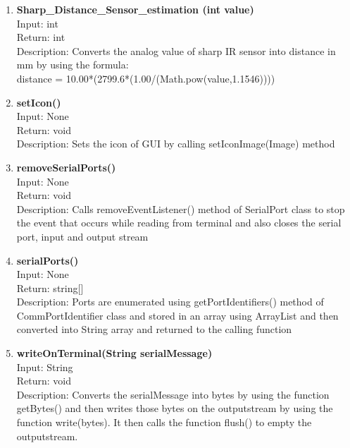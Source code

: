 \documentclass{article}
\begin{document}
\begin{enumerate}
		\item \textbf{Sharp\_Distance\_Sensor\_estimation (int value)} \vspace{0.25cm} \\
		Input: int\\
		Return: int\\
		Description: Converts the analog value of sharp IR sensor into distance in mm by using the formula:\\ distance =  10.00*(2799.6*(1.00/(Math.pow(value,1.1546)))) \vspace{0.5cm} \\
		\item \textbf{setIcon()} \vspace{0.25cm} \\
		Input: None\\
		Return: void\\
		Description: Sets the icon of GUI by calling setIconImage(Image) method \vspace{0.5cm} \\
		\item \textbf{removeSerialPorts()} \vspace{0.25cm} \\
		Input: None\\
		Return: void\\
		Description: Calls removeEventListener() method of SerialPort class to stop the event that occurs while reading from terminal and also closes the serial port, input and output stream \vspace{0.5cm} \\
		\item \textbf{serialPorts()} \vspace{0.25cm} \\
		Input: None\\
		Return: string[]\\
		Description: Ports are enumerated using getPortIdentifiers() method of CommPortIdentifier class and stored in an array using ArrayList and then converted into String array and returned to the calling function \vspace{0.5cm} \\
		\item \textbf{writeOnTerminal(String serialMessage)} \vspace{0.25cm} \\
		Input: String\\
		Return: void\\
		Description: Converts the serialMessage into bytes by using the function getBytes() and then writes those bytes on the outputstream by using the function write(bytes). It then calls the function flush() to empty the outputstream. \vspace{0.5cm} \\

\end{enumerate}
\end{document}
